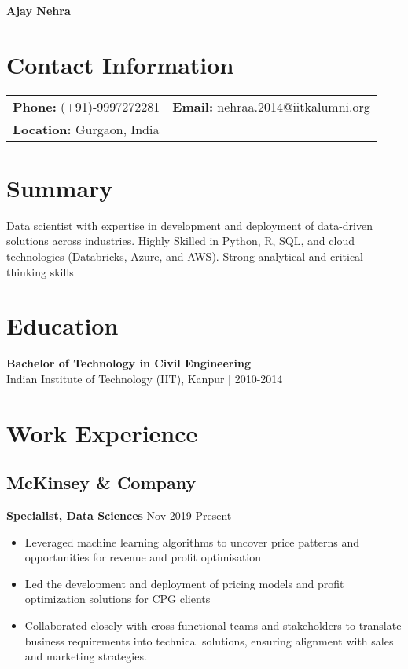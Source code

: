 \documentclass[a4paper,10pt]{article}
\begin{document}
\begin{center}
    \textbf{\Huge Ajay Nehra}
\end{center}

\section*{Contact Information}
\begin{tabularx}{\textwidth}{@{}ll}
    \textbf{Phone:} (+91)-9997272281 & \textbf{Email:} nehraa.2014@iitkalumni.org \\
    \textbf{Location:} Gurgaon, India & \\
\end{tabularx}

\section*{Summary}
Data scientist with expertise in development and deployment of data-driven solutions across industries. Highly Skilled in Python, R, SQL, and cloud technologies (Databricks, Azure, and AWS). Strong analytical and critical thinking skills 
\section*{Education}
\textbf{Bachelor of Technology in Civil Engineering} \\
Indian Institute of Technology (IIT), Kanpur | 2010-2014

\section*{Work Experience}
\subsection*{McKinsey \& Company}
\textbf{Specialist, Data Sciences} \hfill Nov 2019-Present
\begin{itemize}[leftmargin=*]
    \item Leveraged machine learning algorithms to uncover price patterns and opportunities for revenue and profit optimisation
    \item Led the development and deployment of pricing models and profit optimization solutions for CPG clients
    \item Collaborated closely with cross-functional teams and stakeholders to translate business requirements into technical solutions, ensuring alignment with sales and marketing strategies.
\end{itemize}
\end{document}
